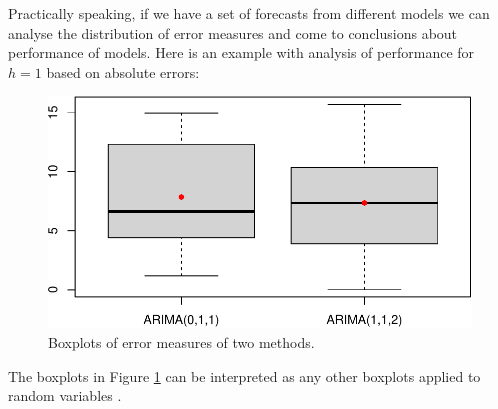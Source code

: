 \documentclass[
]{book}
\newenvironment{Shaded}{\begin{snugshade}}{\end{snugshade}}
\newcommand{\AttributeTok}[1]{\textcolor[rgb]{0.77,0.63,0.00}{#1}}
\newcommand{\DecValTok}[1]{\textcolor[rgb]{0.00,0.00,0.81}{#1}}
\newcommand{\FunctionTok}[1]{\textcolor[rgb]{0.00,0.00,0.00}{#1}}
\newcommand{\NormalTok}[1]{#1}
\newcommand{\OtherTok}[1]{\textcolor[rgb]{0.56,0.35,0.01}{#1}}
\newcommand{\SpecialCharTok}[1]{\textcolor[rgb]{0.00,0.00,0.00}{#1}}
\newcommand{\StringTok}[1]{\textcolor[rgb]{0.31,0.60,0.02}{#1}}
\theoremstyle{definition}
\theoremstyle{definition}
\theoremstyle{definition}
\theoremstyle{definition}
\theoremstyle{remark}
\begin{document}
Practically speaking, if we have a set of forecasts from different models we can analyse the distribution of error measures and come to conclusions about performance of models. Here is an example with analysis of performance for \(h=1\) based on absolute errors:

\begin{Shaded}
\end{Shaded}

\begin{figure}
\centering
\includegraphics{adam_files/figure-latex/roExample02-1.pdf}
\caption{\label{fig:roExample02}Boxplots of error measures of two methods.}
\end{figure}

The boxplots in Figure \ref{fig:roExample02} can be interpreted as any other boxplots applied to random variables \citep[see for example, discussion in Section 2.2 of][]{SvetunkovSBA}.
\end{document}
